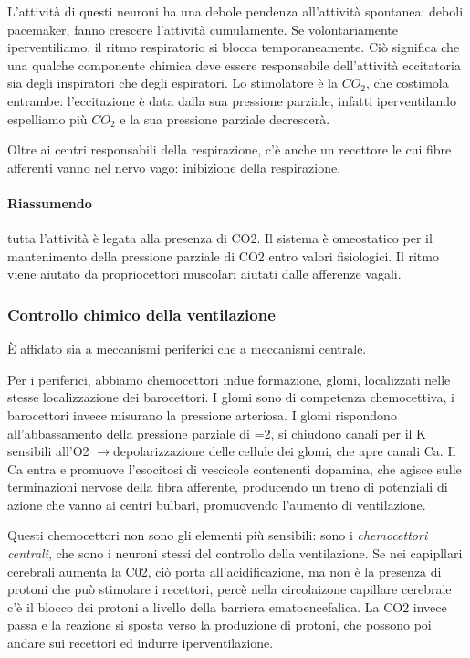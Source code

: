 \documentclass[a4paper,12pt]{article}
\newcommand{\lfreccia}{\ensuremath{\longrightarrow}}
\begin{document}
L'attività di questi neuroni ha una debole pendenza all'attività spontanea: deboli pacemaker, fanno crescere l'attività cumulamente. Se volontariamente iperventiliamo, il ritmo respiratorio si blocca temporaneamente. Ciò significa che una qualche componente chimica deve essere responsabile dell'attività eccitatoria sia degli inspiratori che degli espiratori. Lo stimolatore è la $CO_{2}$, che costimola entrambe: l'eccitazione è data dalla sua pressione parziale, infatti iperventilando espelliamo più $CO_{2}$ e la sua pressione parziale decrescerà.

Oltre ai centri responsabili della respirazione, c'è anche un recettore le cui fibre afferenti vanno nel nervo vago: inibizione della respirazione.

\paragraph{Riassumendo}
tutta l'attività è legata alla presenza di CO2. Il sistema è omeostatico per il mantenimento della pressione parziale di CO2 entro valori fisiologici. 
Il ritmo viene aiutato da propriocettori muscolari aiutati dalle afferenze vagali.
\paragraph{}

\subsubsection{Controllo chimico della ventilazione}
È affidato sia a meccanismi periferici che a meccanismi centrale.

Per i periferici, abbiamo chemocettori indue formazione, glomi, localizzati nelle stesse localizzazione dei barocettori. I glomi sono di competenza chemocettiva, i barocettori invece misurano la pressione arteriosa. I glomi rispondono all'abbassamento della pressione parziale di =2, si chiudono canali per il K sensibili all'O2 \lfreccia depolarizzazione delle cellule dei glomi, che apre canali Ca. Il Ca entra e promuove l'esocitosi di vescicole contenenti dopamina, che agisce sulle terminazioni nervose della fibra afferente, producendo un treno di potenziali di azione che vanno ai centri bulbari, promuovendo l'aumento di ventilazione.

Questi chemocettori non sono gli elementi più sensibili: sono i \emph{chemocettori centrali}, che sono i neuroni stessi del controllo della ventilazione. Se nei capipllari cerebrali aumenta la C02, ciò porta all'acidificazione, ma non è la presenza di protoni che può stimolare i recettori, percè nella circolaizone capillare cerebrale c'è il blocco dei protoni a livello della barriera ematoencefalica. La CO2 invece passa e la reazione si sposta verso la produzione di protoni, che possono poi andare sui recettori ed indurre iperventilazione.
\end{document}
